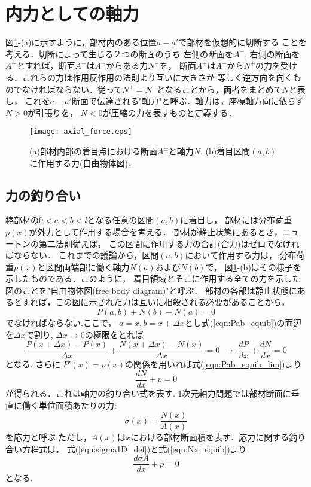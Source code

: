\documentclass[10pt,a4j]{jbook}
\begin{document}
\section{内力としての軸力}
図\ref{fig:defN}-(a)に示すように，部材内のある位置$a-a'$で部材を仮想的に切断する
ことを考える．切断によって生じる２つの断面のうち
左側の断面を$A^-$, 右側の断面を$A^+$とすれば，断面$A^−$は$A^+$からある力$N^-$を，
断面$A^+$は$A^-$から$N^+$の力を受ける．これらの力は作用反作用の法則より互いに大きさが
等しく逆方向を向くものでなければならない．従って$N^+=N^-$となることから，両者をまとめて$N$と表し，
これを$a-a'$断面で伝達される"軸力"と呼ぶ．軸力は，座標軸方向に依らず$N>0$が引張りを，
$N<0$が圧縮の力を表すものと定義する．
\begin{figure}[h]
	\begin{center}
	\texttt{[image: axial\_force.eps]} 
	\end{center}
	\caption{(a)部材内部の着目点における断面$A^{\pm}$と軸力$N$.
	(b)着目区間$(a,b)$に作用する力(自由物体図)．} 
	\label{fig:defN}
\end{figure}
\subsection{力の釣り合い}
棒部材の$0<a<b<l$となる任意の区間$(a,b)$に着目し，
部材には分布荷重$p(x)$が外力として作用する場合を考える．
部材が静止状態にあるとき，ニュートンの第二法則従えば，
この区間に作用する力の合計(合力)はゼロでなければならない．
これまでの議論から，区間$(a,b)$において作用する力は，
分布荷重$p(x)$と区間両端部に働く軸力$N(a)$および$N(b)$で，
図\ref{fig:defN}-(b)はその様子を示したものである．このように，
着目領域とそこに作用する全ての力を示した図のことを"自由物体図(free body diagram)"と呼ぶ．
部材の各部は静止状態にあるとすれば，この図に示された力は互いに相殺される必要があることから，
\begin{equation}
	P(a,b)+N(b)-N(a)=0
	\label{eqn:Pab_equib}
\end{equation}
でなければならない.ここで，
$a=x, b=x+\Delta x$とし式(\ref{eqn:Pab_equib})の両辺を$\Delta x$で割り, 
$\Delta x\rightarrow 0$の極限をとれば
\begin{equation}
	\frac{P(x+\Delta x)-P(x)}{\Delta x}+\frac{N(x+\Delta x)-N(x)}{\Delta x}=0 \,\,
	\rightarrow
	\, \,
	\frac{dP}{dx}+\frac{dN}{dx}=0
	\label{eqn:Pab_equib_lim}
\end{equation}
となる. さらに,$P'(x)=p(x)$の関係を用いれば式(\ref{eqn:Pab_equib_lim})より
\begin{equation}
	\frac{dN}{dx}+p=0
	\label{eqn:Nx_equib}
\end{equation}
が得られる．これは軸力の釣り合い式を表す. 
1次元軸力問題では部材断面に垂直に働く単位面積あたりの力:
\begin{equation}
	\sigma(x) = \frac{N(x)}{A(x)}
	\label{eqn:sigma1D_def}
\end{equation}
を応力と呼ぶ.ただし，$A(x)$は$x$における部材断面積を表す．応力に関する釣り合い方程式は，
式(\ref{eqn:sigma1D_def})と式(\ref{eqn:Nx_equib})より
\begin{equation}
	\frac{d\sigma A}{dx}+p=0
	\label{eqn:sigx_equib}
\end{equation}
となる.
\end{document}
